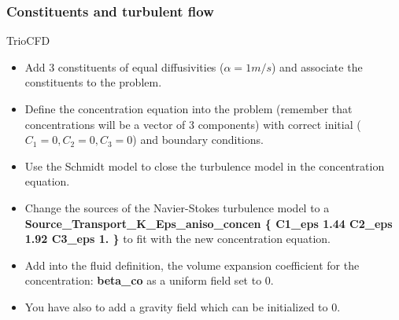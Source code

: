 \documentclass[10pt, hyperref={unicode=true,pdfusetitle, bookmarks=true,bookmarksnumbered=false,bookmarksopen=false, breaklinks=false,pdfborder={0 0 1},backref=true,colorlinks=true,linkcolor=darkblue,pageanchor}]{beamer}
\begin{document}
\begin{frame}
\frametitle{Constituents and turbulent flow}
\begin{block}{TrioCFD}

\begin{itemize}

\item Add 3 constituents of equal diffusivities ($\alpha=1m/s$) and associate the constituents to the problem.

\item Define the concentration equation into the problem (remember that concentrations will be a vector of 3 components) with correct initial ($C_1=0, C_2=0, C_3=0$) and boundary conditions.

\item Use the Schmidt model to close the turbulence model in the concentration equation.

\item Change the sources of the Navier-Stokes turbulence model to a \textbf{Source\_Transport\_K\_Eps\_aniso\_concen \{ C1\_eps 1.44 C2\_eps 1.92 C3\_eps 1. \} } to fit with the new concentration equation.

\item Add into the fluid definition, the volume expansion coefficient for the concentration: \textbf{beta\_co} as a uniform field set to 0.

\item You have also to add a gravity field which can be initialized to 0.
\end{itemize}

\end{block}
\end{frame}
\end{document}
